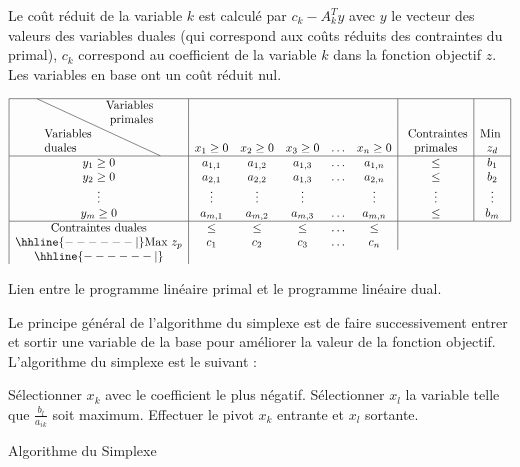 \begin{mydef}
Le coût réduit de la variable $k$ est calculé par $c_k - A_k^Ty$ avec $y$ le vecteur des valeurs des variables duales (qui correspond aux coûts réduits des contraintes du primal), $c_k$ correspond au coefficient de la variable $k$ dans la fonction objectif $z$. Les variables en base ont un coût réduit nul.
\label{def:cout}
\end{mydef}


\begin{table}[H]
$$
\begin{array}{|c|ccccc|c|c|}
\hline
\multirow{4}{*}{\text{\diagbox{Variables\\ duales}{Variables \\primales}}} & \multicolumn{5}{c|}{} & & \\
& & & & & & & \\
 & & & & & & \text{ Contraintes}& \text{Min }\\
  &  x_1  \geq 0& x_2 \geq 0&x_3 \geq 0& \ldots & x_n\geq 0 & \text{primales} &  z_d\\
\hline
y_1 \geq 0 & a_{1,1}& a_{1,2}& a_{1,3}&\ldots&a_{1,n} & \leq  & b_1 \\
y_2 \geq 0 & a_{2,1}& a_{2,2}& a_{1,3}&\ldots&a_{2,n} & \leq  & b_2 \\
\vdots &  \vdots & \vdots & \vdots & & \vdots & \vdots & \vdots\\
y_m \geq 0 & a_{m,1}& a_{m,2}& a_{m,3}&\ldots&a_{m,n} & \leq  & b_m \\
\hline
\text{Contraintes duales} & \leq & \leq &\leq & \ldots & \leq   \\
\hhline{------|}
\text{Max }z_p & c_1 &c_2 & c_3 &  \ldots & c_n \\
\hhline{------|}
\end{array}
$$
\caption{Lien entre le programme linéaire primal et le programme linéaire dual. \label{table:primal_dual}}
\end{table}

Le principe général de l'algorithme du simplexe est de faire successivement entrer et sortir une variable de la base pour améliorer la valeur de la fonction objectif.
L'algorithme du simplexe est le suivant : 

\begin{algorithm}[H]
\begin{algorithmic}[1]
\Debut
{}
 \LState Sélectionner $x_k$ avec le coefficient le plus négatif. 
 \LState Sélectionner $x_l$ la variable telle que $\frac{b_l}{a_{ik}}$ soit maximum.
 \LState Effectuer le pivot $x_k$ entrante et $x_l$ sortante.
\EndWhile
\Fin
\end{algorithmic}
\caption{Algorithme du Simplexe}
\end{algorithm}


